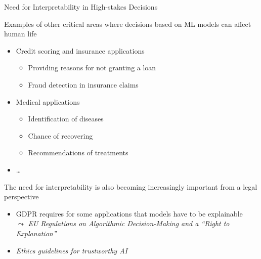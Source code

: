 \documentclass[11pt,compress,t,notes=noshow, aspectratio=169, xcolor=table]{beamer}
\begin{document}
\begin{frame}{Need for Interpretability in High-stakes Decisions}

Examples of other critical areas where decisions based on ML models can affect human life 
    \begin{itemize}
        
        \item Credit scoring and insurance applications
        \begin{itemize}
            \item Providing reasons for not granting a loan
            \item Fraud detection in insurance claims
        \end{itemize}
\pause
        \item Medical applications %
        \begin{itemize}
            \item Identification of diseases
            \item Chance of recovering
            \item Recommendations of treatments
        \end{itemize}
\pause

        \item \ldots
    \end{itemize}
    
    \pause
    The need for interpretability is also becoming increasingly important from a legal perspective
    
    \begin{itemize}
    \item GDPR requires for some applications that models have to be explainable \\
    $\leadsto$ \textit{EU Regulations on Algorithmic Decision-Making and a ``Right to Explanation''} 
    
    \item \textit{Ethics guidelines for trustworthy AI}

    \end{itemize}
\end{frame}
\end{document}
